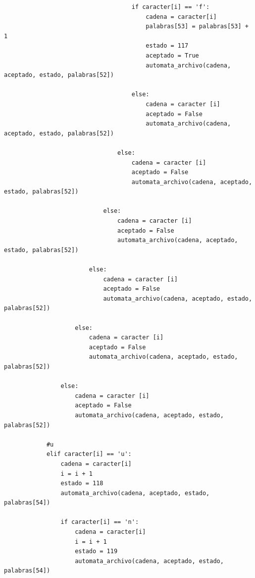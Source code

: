 \documentclass{article}
\begin{document}
\begin{flushleft}
\begin{lstlisting}
                                    if caracter[i] == 'f':
                                        cadena = caracter[i]
                                        palabras[53] = palabras[53] + 1
                                        estado = 117
                                        aceptado = True
                                        automata_archivo(cadena, aceptado, estado, palabras[52])
                                            
                                    else:
                                        cadena = caracter [i]
                                        aceptado = False
                                        automata_archivo(cadena, aceptado, estado, palabras[52])
                                    
                                else:
                                    cadena = caracter [i]
                                    aceptado = False
                                    automata_archivo(cadena, aceptado, estado, palabras[52])
                                        
                            else:
                                cadena = caracter [i]
                                aceptado = False
                                automata_archivo(cadena, aceptado, estado, palabras[52])
                                    
                        else:
                            cadena = caracter [i]
                            aceptado = False
                            automata_archivo(cadena, aceptado, estado, palabras[52])
                                
                    else:
                        cadena = caracter [i]
                        aceptado = False
                        automata_archivo(cadena, aceptado, estado, palabras[52])
                            
                else:
                    cadena = caracter [i]
                    aceptado = False
                    automata_archivo(cadena, aceptado, estado, palabras[52])
            
            #u
            elif caracter[i] == 'u':
                cadena = caracter[i]
                i = i + 1
                estado = 118
                automata_archivo(cadena, aceptado, estado, palabras[54])
                    
                if caracter[i] == 'n':
                    cadena = caracter[i]
                    i = i + 1
                    estado = 119
                    automata_archivo(cadena, aceptado, estado, palabras[54])
                    

\end{lstlisting}
\end{flushleft}
\end{document}
